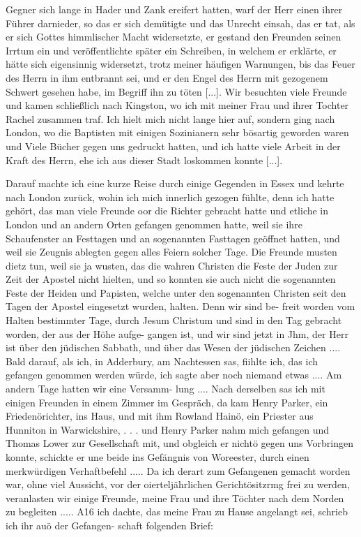 Gegner sich lange in Hader und Zank ereifert hatten, warf der
Herr einen ihrer Führer darnieder, so das er sich demütigte und
das Unrecht einsah, das er tat, als er sich Gottes himmlischer
Macht widersetzte, er gestand den Freunden seinen Irrtum ein
und veröffentlichte später ein Schreiben, in welchem er erklärte,
er hätte sich eigensinnig widersetzt, trotz meiner häufigen 
Warnungen, bis das Feuer des Herrn in ihm entbrannt sei, und er
den Engel des Herrn mit gezogenem Schwert gesehen habe, im
Begriff ihn zu töten [...]. Wir besuchten viele Freunde und
kamen schließlich nach Kingston, wo ich mit 
meiner Frau und
ihrer Tochter Rachel zusammen traf. 
Ich hielt mich nicht lange
hier auf, sondern ging nach London, wo die Baptisten mit einigen
Sozinianern sehr bösartig geworden waren und Viele Bücher gegen
uns gedruckt hatten, und ich hatte viele Arbeit in der Kraft des
Herrn, ehe ich aus dieser Stadt loskommen konnte [...].

Darauf machte ich eine kurze Reise durch einige Gegenden
in Essex und kehrte nach London zurück, wohin ich mich innerlich
gezogen fühlte, denn ich hatte gehört, das man viele Freunde
oor die Richter gebracht hatte und etliche in London und an andern
Orten gefangen genommen hatte, weil sie ihre Schaufenster an
Festtagen und an sogenannten Fasttagen geöffnet hatten, und
weil sie Zeugnis ablegten gegen alles Feiern solcher Tage. Die
Freunde musten dietz tun, weil sie ja wusten, das die wahren
Christen die Feste der Juden zur Zeit der Apostel nicht hielten,
und so konnten sie auch nicht die sogenannten Feste der Heiden
und Papisten, welche unter den sogenannten Christen seit den
Tagen der Apostel eingesetzt wurden, halten. Denn wir sind be-
freit worden vom Halten bestimmter Tage, durch Jesum Christum
und sind in den Tag gebracht worden, der aus der Höhe aufge-
gangen ist, und wir sind jetzt in Jhm, der Herr ist über den
jüdischen Sabbath, und über das Wesen der jüdischen Zeichen ....
Bald darauf, als ich, in Adderbury, am Nachtessen sas, fiihlte
ich, das ich gefangen genommen werden würde, ich sagte aber noch
niemand etwas .... Am andern Tage hatten wir eine Versamm-
lung .... Nach derselben sas ich mit einigen Freunden in einem
Zimmer im Gespräch, da kam Henry Parker, ein Friedenörichter,
ins Haus, und mit ihm Rowland Hainö, ein Priester aus Hunniton
in Warwickshire, . . . und Henry Parker nahm mich gefangen und
Thomas Lower zur Gesellschaft mit, und obgleich er nichtö gegen
uns Vorbringen konnte, schickte er une beide ins Gefängnis von
Woreester, durch einen merkwürdigen Verhaftbefehl .....
Da ich derart zum Gefangenen gemacht worden war, ohne viel
Aussicht, vor der oierteljährlichen Gerichtösitzrmg frei zu werden,
veranlasten wir einige Freunde, meine Frau und ihre Töchter
nach dem Norden zu begleiten ..... A16 ich dachte, das meine
Frau zu Hause angelangt sei, schrieb ich ihr auö der Gefangen-
schaft folgenden Brief:


